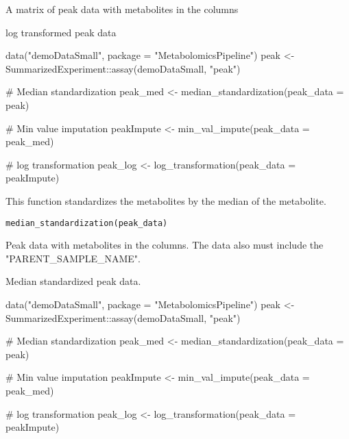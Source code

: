\documentclass[a4paper]{book}
\begin{document}
%
\begin{Arguments}
\begin{ldescription}
\item[\code{peak\_data}] A matrix of peak data with metabolites in the columns
\end{ldescription}
\end{Arguments}
%
\begin{Value}
log transformed peak data
\end{Value}
%
\begin{Examples}
\begin{ExampleCode}
data("demoDataSmall", package = "MetabolomicsPipeline")
peak <- SummarizedExperiment::assay(demoDataSmall, "peak")

# Median standardization
peak_med <- median_standardization(peak_data = peak)

# Min value imputation
peakImpute <- min_val_impute(peak_data = peak_med)

# log transformation
peak_log <- log_transformation(peak_data = peakImpute)


\end{ExampleCode}
\end{Examples}
%
\begin{Description}
This function standardizes the metabolites by the median of the metabolite.
\end{Description}
%
\begin{Usage}
\begin{verbatim}
median_standardization(peak_data)
\end{verbatim}
\end{Usage}
%
\begin{Arguments}
\begin{ldescription}
\item[\code{peak\_data}] Peak data with metabolites in the columns. The data also
must include the "PARENT\_SAMPLE\_NAME".
\end{ldescription}
\end{Arguments}
%
\begin{Value}
Median standardized peak data.
\end{Value}
%
\begin{Examples}
\begin{ExampleCode}
data("demoDataSmall", package = "MetabolomicsPipeline")
peak <- SummarizedExperiment::assay(demoDataSmall, "peak")

# Median standardization
peak_med <- median_standardization(peak_data = peak)

# Min value imputation
peakImpute <- min_val_impute(peak_data = peak_med)

# log transformation
peak_log <- log_transformation(peak_data = peakImpute)



\end{ExampleCode}
\end{Examples}
\end{document}
